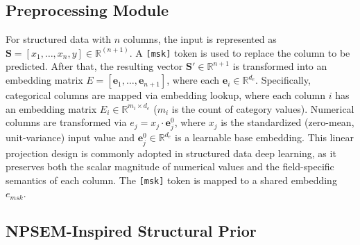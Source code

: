 \documentclass[conference]{IEEEtran}
\newcommand{\rlend}[1]{{\color{black}#1}}
\newcommand{\syadd}[1]{{\color{black}#1}}
\newcommand{\syfix}[1]{{\color{black}#1}}
\newcommand{\syone}[1]{{\color{black}#1}}
\begin{document}
\subsection{Preprocessing Module}
\rlend{
For structured data with $n$ columns, the input is represented as $\mathbf{S} = [x_1, \ldots, x_n, y] \in \mathbb{R}^{(n+1)}$. 
\syfix{
A \texttt{[msk]} token is used to replace the column to be predicted.}
After that, the resulting vector $\mathbf{S}' \in \mathbb{R}^{n+1}$ is transformed into an embedding matrix $E = [\mathbf{e}_1, \dots, \mathbf{e}_{n+1}]$, where each $\mathbf{e}_i \in \mathbb{R}^{d_e}$. 
Specifically, categorical columns are mapped via embedding lookup, where each column $i$ has an embedding matrix $E_i \in \mathbb{R}^{m_i \times d_e}$ ($m_i$ is the count of category values). 
Numerical columns are transformed via $e_j = x_j \cdot \mathbf{e}^0_j$, where $x_j$ is the standardized \syadd{(zero-mean, unit-variance)} input value and $\mathbf{e}^0_j \in \mathbb{R}^{d_e}$ is a learnable base embedding. 
\syadd{This linear projection design is commonly adopted in structured data deep learning\cite{r:armnet, r:autoint, r:ft-transformer}, as it preserves both the scalar magnitude of numerical values and the field-specific semantics of each column.
}
\syadd{The \texttt{[msk]} token is mapped to a shared embedding $e_{msk}$.}
}

\subsection{\syone{NPSEM-Inspired Structural Prior}}\label{sec:causal_theory}
\end{document}
